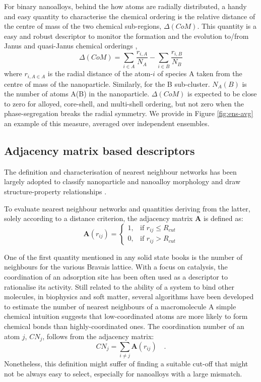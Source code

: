 For binary nanoalloys, behind the how atoms are radially distributed, a handy and easy quantity to characterise the chemical ordering is the relative distance of the centre of mass of the two chemical sub-regions, $\Delta(CoM)$. This quantity is a easy and robust descriptor to monitor the formation and the evolution to/from Janus and quasi-Janus chemical orderings \cite{D2CP00648K},
\begin{equation}
    \Delta(CoM) = \sum_{i \in A} \frac{r_{i,A}}{N_A} - \sum_{i \in B} \frac{r_{i,B}}{N_B} 
\end{equation}
where $r_{i,A \in A}$ is the radial distance of the atom-$i$ of species A taken from the centre of mass of the nanoparticle. Similarly, for the B sub-cluster. $N_A(B)$ is the number of atoms A(B) in the nanoparticle. $\Delta(CoM)$ is expected to be close to zero for alloyed, core-shell, and multi-shell ordering, but not zero when the phase-segregation breaks the radial symmetry. We provide in Figure \ref{fig:ens-avg} an example of this measure, averaged over independent ensembles. 

\subsection{Adjacency matrix based descriptors}

The definition and characterisation of nearest neighbour networks has been largely adopted to classify nanoparticle and nanoalloy morphology and draw structure-property relationships \cite{C8NR02278J,Perea2015,Stukowski_2012}.
%

To evaluate nearest neighbour networks and quantities deriving from the latter, solely according to a distance criterion, the adjacency matrix \textbf{A} is defined as:
\begin{equation}
        \textbf{A} \left( r_{ij} \right) = \begin{cases}
    1 ,& \text{if } r_{ij}\leq R_{cut}\\
    0,              & \text{if } r_{ij} > R_{cut}
\end{cases} 
    \label{eqn:CN}
\end{equation}


One of the first quantity mentioned in any solid state books is the number of neighbours for the various Bravais lattice. 
With a focus on catalysis, the coordination of an adsorption site has been often used as a descriptor to rationalise its activity. 
Still related to the ability of a system to bind other molecules, in biophysics and soft matter, several algorithms have been developed to estimate the number of nearest neighbours of a macromolecule \cite{vanmeel2012}
%
A simple chemical intuition suggests that low-coordinated atoms are more likely to form chemical bonds than highly-coordinated ones.
%
The coordination number of an atom $j$, $CN_{j}$,   follows from the adjacency matrix:
\begin{equation}
    CN_{j} = \sum _{i \neq j} \textbf{A} \left( r_{ij} \right) \mbox{~~~.}
    \label{eqn:CN_VM}
\end{equation}
Nonetheless, this definition might suffer of finding a suitable cut-off that might not be always easy to select, especially for nanoalloys with a large mismatch.

